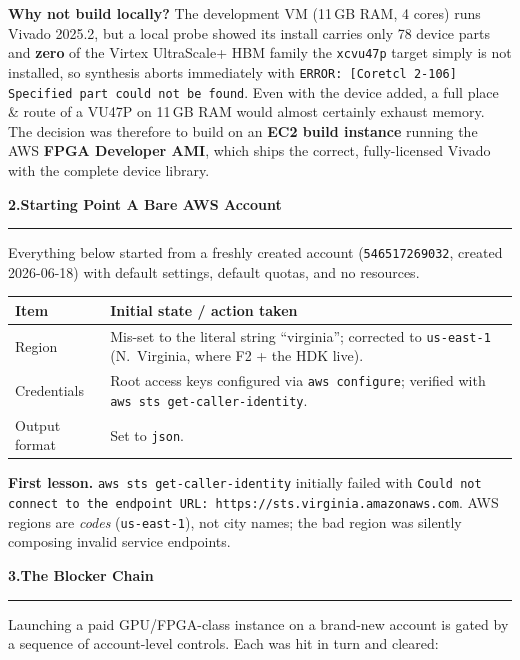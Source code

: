 \documentclass[10pt,a4paper]{article}
\newcommand{\sectionrule}{\par\nobreak\vspace{1pt}\textcolor{rulegray}{\rule{\linewidth}{0.8pt}}\par\vspace{1pt}}
\newcommand{\fpath}[1]{\texttt{\textcolor{hdrblue}{#1}}}
\newcommand{\cmd}[1]{\texttt{\textcolor{accentteal}{#1}}}
\newcommand{\sechead}[2]{{\large\bfseries\color{hdrblue} #1\quad #2}\sectionrule}
\begin{document}
\textbf{Why not build locally?} The development VM (11\,GB RAM, 4 cores) runs
Vivado 2025.2, but a local probe showed its install carries only 78 device parts
and \textbf{zero} of the Virtex UltraScale+ HBM family \textendash{} the
\fpath{xcvu47p} target simply is not installed, so synthesis aborts immediately
with \cmd{ERROR: [Coretcl 2-106] Specified part could not be found}. Even with
the device added, a full place \& route of a VU47P on 11\,GB RAM would almost
certainly exhaust memory. The decision was therefore to build on an
\textbf{EC2 build instance} running the AWS \textbf{FPGA Developer AMI}, which
ships the correct, fully-licensed Vivado with the complete device library.

\sechead{2.}{Starting Point \textendash{} A Bare AWS Account}

Everything below started from a freshly created account (\fpath{546517269032},
created 2026-06-18) with default settings, default quotas, and no resources.

\begin{center}\small
\begin{tabularx}{\linewidth}{@{}lX@{}}
\toprule
\textbf{Item} & \textbf{Initial state / action taken} \\
\midrule
Region            & Mis-set to the literal string ``virginia''; corrected to \fpath{us-east-1} (N.\ Virginia, where F2 + the HDK live). \\
Credentials       & Root access keys configured via \cmd{aws configure}; verified with \cmd{aws sts get-caller-identity}. \\
Output format     & Set to \fpath{json}. \\
\bottomrule
\end{tabularx}
\end{center}

\begin{warnbox}
\textbf{First lesson.} \cmd{aws sts get-caller-identity} initially failed with
\cmd{Could not connect to the endpoint URL: https://sts.virginia.amazonaws.com}.
AWS regions are \emph{codes} (\fpath{us-east-1}), not city names; the bad region
was silently composing invalid service endpoints.
\end{warnbox}

\sechead{3.}{The Blocker Chain}

Launching a paid GPU/FPGA-class instance on a brand-new account is gated by a
sequence of account-level controls. Each was hit in turn and cleared:
\end{document}
